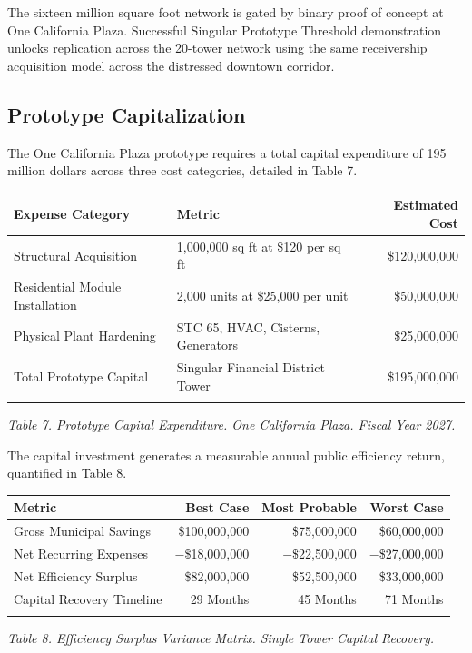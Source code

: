 \documentclass[12pt, letterpaper]{article}
\begin{document}
The sixteen million square foot network is gated by binary proof of concept at One California Plaza. Successful Singular Prototype Threshold demonstration unlocks replication across the 20-tower network using the same receivership acquisition model across the distressed downtown corridor.


\subsection{Prototype Capitalization}

The One California Plaza prototype requires a total capital expenditure of 195 million dollars across three cost categories, detailed in Table 7.

{\singlespacing
\begin{tabularx}{\textwidth}{@{}lXr@{}}
\toprule
\rowcolor{rowgray}
Expense Category & Metric & Estimated Cost \\
\midrule
Structural Acquisition & 1,000,000 sq ft at \$120 per sq ft & \$120,000,000 \\
\rowcolor{rowgray}
Residential Module Installation & 2,000 units at \$25,000 per unit & \$50,000,000 \\
Physical Plant Hardening & STC 65, HVAC, Cisterns, Generators & \$25,000,000 \\
\midrule
Total Prototype Capital & Singular Financial District Tower & \$195,000,000 \\
\addlinespace[4pt]
\bottomrule
\end{tabularx}\par
\vspace{8pt}
\noindent\textit{Table 7. Prototype Capital Expenditure. One California Plaza. Fiscal Year 2027.}
\par}
The capital investment generates a measurable annual public efficiency return, quantified in Table 8.

{\singlespacing
\begin{tabularx}{\textwidth}{@{}lrrr@{}}
\toprule
\rowcolor{rowgray}
Metric & Best Case & Most Probable & Worst Case \\
\midrule
Gross Municipal Savings & \$100,000,000 & \$75,000,000 & \$60,000,000 \\
\rowcolor{rowgray}
Net Recurring Expenses & $-$\$18,000,000 & $-$\$22,500,000 & $-$\$27,000,000 \\
Net Efficiency Surplus & \$82,000,000 & \$52,500,000 & \$33,000,000 \\
\rowcolor{rowgray}
Capital Recovery Timeline & 29 Months & 45 Months & 71 Months \\
\addlinespace[4pt]
\bottomrule
\end{tabularx}\par
\vspace{8pt}
\noindent\textit{Table 8. Efficiency Surplus Variance Matrix. Single Tower Capital Recovery.}
\par}
\end{document}
